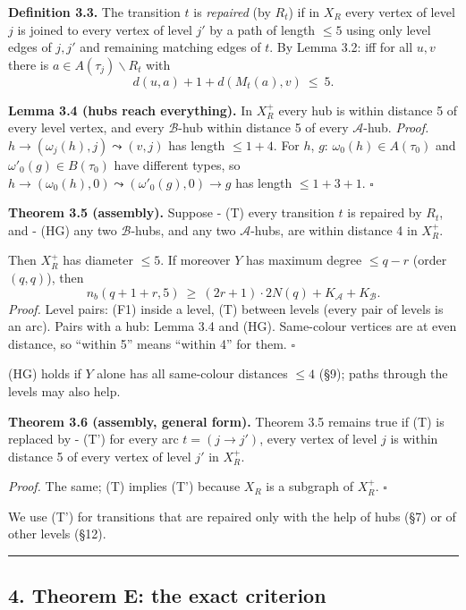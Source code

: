 \documentclass[
  11pt,
]{article}
\begin{document}
\textbf{Definition 3.3.} The transition \(t\) is \emph{repaired} (by
\(R_t\)) if in \(X_R\) every vertex of level \(j\) is joined to every
vertex of level \(j'\) by a path of length \(\le 5\) using only level
edges of \(j,j'\) and remaining matching edges of \(t\). By Lemma 3.2:
iff for all \(u,v\) there is \(a\in A(\tau_j)\smallsetminus R_t\) with
\[d(u,a)+1+d(M_t(a),v)\ \le\ 5. \tag{3.1}\]

\textbf{Lemma 3.4 (hubs reach everything).} In \(X_R^+\) every hub is
within distance 5 of every level vertex, and every \(\mathcal B\)-hub
within distance 5 of every \(\mathcal A\)-hub. \emph{Proof.}
\(h\to(\omega_j(h),j)\leadsto(v,j)\) has length \(\le 1+4\). For \(h\),
\(g\): \(\omega_0(h)\in A(\tau_0)\) and \(\omega'_0(g)\in B(\tau_0)\)
have different types, so
\(h\to(\omega_0(h),0)\leadsto(\omega'_0(g),0)\to g\) has length
\(\le 1+3+1\). \(\square\)

\textbf{Theorem 3.5 (assembly).} Suppose - (T) every transition \(t\) is
repaired by \(R_t\), and - (HG) any two \(\mathcal B\)-hubs, and any two
\(\mathcal A\)-hubs, are within distance 4 in \(X_R^+\).

Then \(X_R^+\) has diameter \(\le 5\). If moreover \(Y\) has maximum
degree \(\le q-r\) (order \((q,q)\)), then
\[n_b(q+1+r,5)\ \ge\ (2r+1)\cdot 2N(q)+K_{\mathcal A}+K_{\mathcal B}.\]
\emph{Proof.} Level pairs: (F1) inside a level, (T) between levels
(every pair of levels is an arc). Pairs with a hub: Lemma 3.4 and (HG).
Same-colour vertices are at even distance, so ``within 5'' means
``within 4'' for them. \(\square\)

(HG) holds if \(Y\) alone has all same-colour distances \(\le 4\) (§9);
paths through the levels may also help.

\textbf{Theorem 3.6 (assembly, general form).} Theorem 3.5 remains true
if (T) is replaced by - (T') for every arc \(t = (j\to j')\), every
vertex of level \(j\) is within distance 5 of every vertex of level
\(j'\) in \(X_R^+\).

\emph{Proof.} The same; (T) implies (T') because \(X_R\) is a subgraph
of \(X_R^+\). \(\square\)

We use (T') for transitions that are repaired only with the help of hubs
(§7) or of other levels (§12).

\begin{center}\rule{0.5\linewidth}{0.5pt}\end{center}

\hypertarget{theorem-e-the-exact-criterion}{%
\subsection{4. Theorem E: the exact
criterion}\label{theorem-e-the-exact-criterion}}
\end{document}
